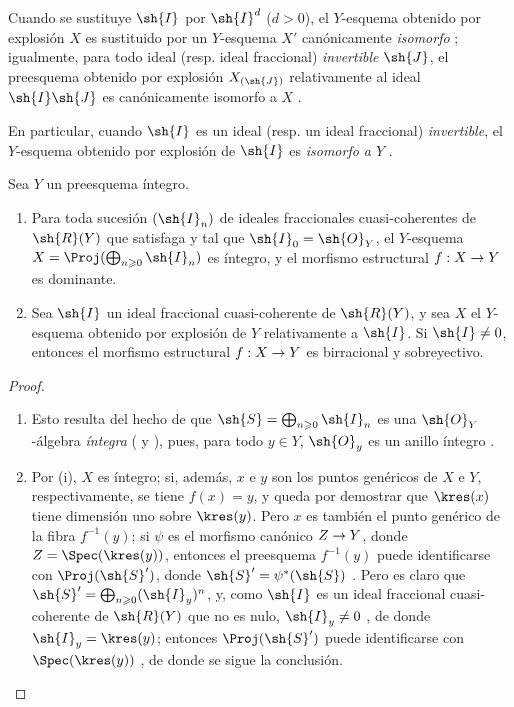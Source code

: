 \documentclass[oneside,10pt]{amsart}
\makeatletter
\renewcommand{\geq}{\geqslant}
\newcommand{\ega@arrow}[2]{\mathchoice{#1}{#2}{#2}{#2}}
\renewcommand{\to}{\ega@arrow{\longrightarrow}{\rightarrow}}
\newcommand{\oldpage}[2][]{\marginnote{\normalfont\footnotesize\textbf{#1}~|~#2}\ignorespaces}
\let\EGAOriginalLabel\label
\renewcommand{\label}[1]{\phantomsection\EGAOriginalLabel{#1}}
\makeatother
\begin{document}
Cuando se sustituye $\sh{I}$ por $\sh{I}^d$ ($d>0$), el $Y$-esquema obtenido por explosión $X$ es sustituido por un $Y$-esquema $X'$ canónicamente \emph{isomorfo} ;
igualmente, para todo ideal (resp. ideal fraccional) \emph{invertible} $\sh{J}$, el preesquema obtenido por explosión $X_{(\sh{J})}$ relativamente al ideal $\sh{I}\sh{J}$ es canónicamente isomorfo a $X$ .

En particular, cuando $\sh{I}$ es un ideal (resp. un ideal fraccional) \emph{invertible}, el $Y$-esquema obtenido por explosión de $\sh{I}$ es \emph{isomorfo a $Y$} .

\begin{proposition}[8.1.4]
\label{II.8.1.4}
Sea $Y$ un preesquema íntegro.
\begin{enumerate}
    \item[\rm{(i)}] Para toda sucesión $(\sh{I}_n)$ de ideales fraccionales cuasi-coherentes de $\sh{R}(Y)$ que satisfaga 
\oldpage[II]{154}
        y tal que $\sh{I}_0=\sh{O}_Y$, el $Y$-esquema $X=\Proj(\bigoplus_{n\geq0}\sh{I}_n)$ es íntegro, y el morfismo estructural $f:X\to Y$ es dominante.
    \item[\rm{(ii)}] Sea $\sh{I}$ un ideal fraccional cuasi-coherente de $\sh{R}(Y)$, y sea $X$ el $Y$-esquema obtenido por explosión de $Y$ relativamente a $\sh{I}$.
        Si $\sh{I}\neq0$, entonces el morfismo estructural $f:X\to Y$ es birracional y sobreyectivo.
\end{enumerate}
\end{proposition}

\begin{proof}
\medskip\noindent
\begin{enumerate}
    \item[\rm{(i)}] Esto resulta del hecho de que $\sh{S}=\bigoplus_{n\geq0}\sh{I}_n$ es una $\sh{O}_Y$-álgebra \emph{íntegra} ( y ), pues, para todo $y\in Y$, $\sh{O}_y$ es un anillo íntegro .
    \item[\rm{(ii)}] Por (i), $X$ es íntegro; si, además, $x$ e $y$ son los puntos genéricos de $X$ e $Y$, respectivamente, se tiene $f(x)=y$, y queda por demostrar que $\kres(x)$ tiene dimensión uno sobre $\kres(y)$.
        Pero $x$ es también el punto genérico de la fibra $f^{-1}(y)$; si $\psi$ es el morfismo canónico $Z\to Y$, donde $Z=\Spec(\kres(y))$, entonces el preesquema $f^{-1}(y)$ puede identificarse con $\Proj(\sh{S}')$, donde $\sh{S}'=\psi^*(\sh{S})$ .
        Pero es claro que $\sh{S}'=\bigoplus_{n\geq0}(\sh{I}_y)^n$, y, como $\sh{I}$ es un ideal fraccional cuasi-coherente de $\sh{R}(Y)$ que no es nulo, $\sh{I}_y\neq0$ , de donde $\sh{I}_y=\kres(y)$;
        entonces $\Proj(\sh{S}')$ puede identificarse con $\Spec(\kres(y))$ , de donde se sigue la conclusión.
\end{enumerate}
\end{proof}
\end{document}
